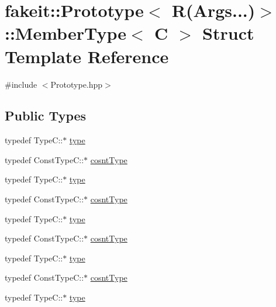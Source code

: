 \hypertarget{structfakeit_1_1Prototype_3_01R_07Args_8_8_8_08_4_1_1MemberType}{}\section{fakeit\+::Prototype$<$ R(Args...)$>$\+::Member\+Type$<$ C $>$ Struct Template Reference}
\label{structfakeit_1_1Prototype_3_01R_07Args_8_8_8_08_4_1_1MemberType}


{\ttfamily \#include $<$Prototype.\+hpp$>$}

\subsection*{Public Types}
\begin{DoxyCompactItemize}
\item 
typedef Type\+C\+::$\ast$ \mbox{\hyperlink{structfakeit_1_1Prototype_3_01R_07Args_8_8_8_08_4_1_1MemberType_a83b41bd489e085916700f036470cc383}{type}}
\item 
typedef Const\+Type\+C\+::$\ast$ \mbox{\hyperlink{structfakeit_1_1Prototype_3_01R_07Args_8_8_8_08_4_1_1MemberType_aeb314b141cc7786abae5c70b3fa35787}{cosnt\+Type}}
\item 
typedef Type\+C\+::$\ast$ \mbox{\hyperlink{structfakeit_1_1Prototype_3_01R_07Args_8_8_8_08_4_1_1MemberType_a83b41bd489e085916700f036470cc383}{type}}
\item 
typedef Const\+Type\+C\+::$\ast$ \mbox{\hyperlink{structfakeit_1_1Prototype_3_01R_07Args_8_8_8_08_4_1_1MemberType_aeb314b141cc7786abae5c70b3fa35787}{cosnt\+Type}}
\item 
typedef Type\+C\+::$\ast$ \mbox{\hyperlink{structfakeit_1_1Prototype_3_01R_07Args_8_8_8_08_4_1_1MemberType_a83b41bd489e085916700f036470cc383}{type}}
\item 
typedef Const\+Type\+C\+::$\ast$ \mbox{\hyperlink{structfakeit_1_1Prototype_3_01R_07Args_8_8_8_08_4_1_1MemberType_aeb314b141cc7786abae5c70b3fa35787}{cosnt\+Type}}
\item 
typedef Type\+C\+::$\ast$ \mbox{\hyperlink{structfakeit_1_1Prototype_3_01R_07Args_8_8_8_08_4_1_1MemberType_a83b41bd489e085916700f036470cc383}{type}}
\item 
typedef Const\+Type\+C\+::$\ast$ \mbox{\hyperlink{structfakeit_1_1Prototype_3_01R_07Args_8_8_8_08_4_1_1MemberType_aeb314b141cc7786abae5c70b3fa35787}{cosnt\+Type}}
\item 
typedef Type\+C\+::$\ast$ \mbox{\hyperlink{structfakeit_1_1Prototype_3_01R_07Args_8_8_8_08_4_1_1MemberType_a83b41bd489e085916700f036470cc383}{type}}

\end{DoxyCompactItemize}

